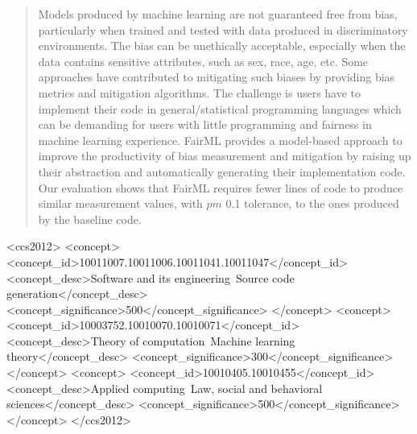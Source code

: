 \documentclass[sigconf,review]{acmart}
\begin{document}
\renewcommand{\shortauthors}{Yohannis and Kolovos}

\begin{abstract}
Models produced by machine learning are not guaranteed free from bias, particularly when trained and tested with data produced in discriminatory environments. The bias can be unethically acceptable, especially when the data contains sensitive attributes, such as sex, race, age, etc. Some approaches have contributed to mitigating such biases by providing bias metrics and mitigation algorithms. The challenge is users have to implement their code in general/statistical programming languages which can be demanding for users with little programming and fairness in machine learning experience. FairML provides a model-based approach to improve the productivity of bias measurement and mitigation by raising up their abstraction and automatically generating their implementation code. Our evaluation shows that FairML requires fewer lines of code to produce similar measurement values, with $pm$ 0.1 tolerance, to the ones produced by the baseline code.
\end{abstract}

\begin{CCSXML}
	<ccs2012>
	<concept>
	<concept_id>10011007.10011006.10011041.10011047</concept_id>
	<concept_desc>Software and its engineering~Source code generation</concept_desc>
	<concept_significance>500</concept_significance>
	</concept>
	<concept>
	<concept_id>10003752.10010070.10010071</concept_id>
	<concept_desc>Theory of computation~Machine learning theory</concept_desc>
	<concept_significance>300</concept_significance>
	</concept>
	<concept>
	<concept_id>10010405.10010455</concept_id>
	<concept_desc>Applied computing~Law, social and behavioral sciences</concept_desc>
	<concept_significance>500</concept_significance>
	</concept>
	</ccs2012>
\end{CCSXML}

\end{document}
